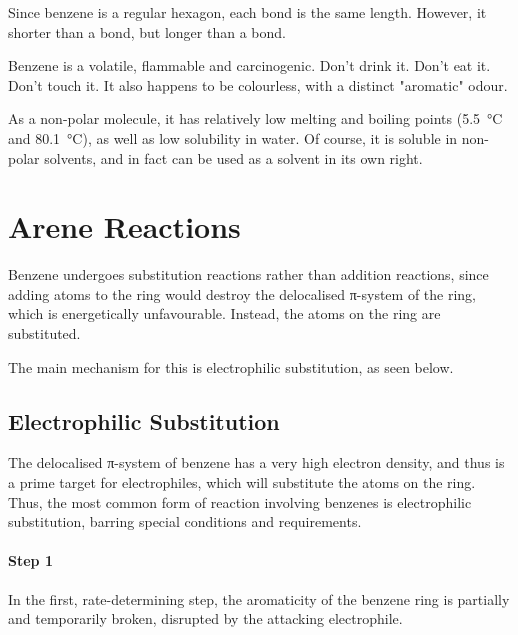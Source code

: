 			Since benzene is a regular hexagon, each  bond is the same length. However, it shorter than a  bond, but longer
			than a  bond.

			Benzene is a volatile, flammable and carcinogenic. Don't drink it. Don't eat it. Don't touch it. It also happens to be colourless,
			with a distinct "aromatic" odour.

			As a non-polar molecule, it has relatively low melting and boiling points (\SI{5.5}{\celsius} and \SI{80.1}{\celsius}), as well as low
			solubility in water. Of course, it is soluble in non-polar solvents, and in fact can be used as a solvent in its own right.



	\pagebreak
	\section{Arene Reactions}

		Benzene undergoes substitution reactions rather than addition reactions, since adding atoms to the ring would destroy the
		delocalised π-system of the ring, which is energetically unfavourable. Instead, the  atoms on the ring are substituted.

		The main mechanism for this is electrophilic substitution, as seen below.

		\subsection{Electrophilic Substitution}

			The delocalised π-system of benzene has a very high electron density, and thus is a prime target for electrophiles, which
			will substitute the  atoms on the ring. Thus, the most common form of reaction involving benzenes is electrophilic
			substitution, barring special conditions and requirements.

			\paragraph{Step 1}

			In the first, rate-determining step, the aromaticity of the benzene ring is partially and temporarily broken, disrupted by
			the attacking electrophile.




